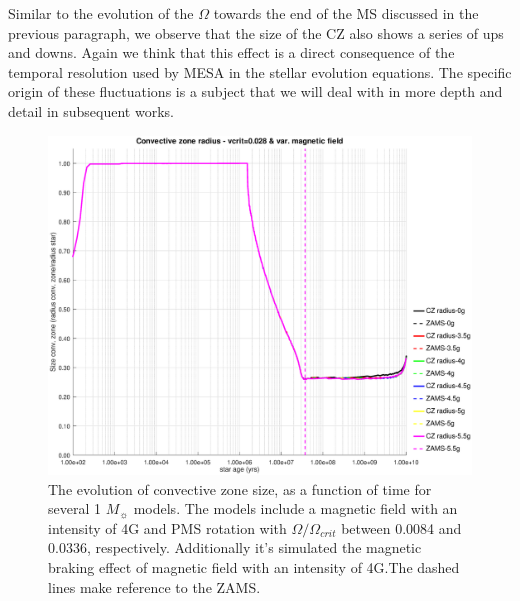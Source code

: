 \documentclass[fleqn,usenatbib]{mnras}
\begin{document}
Similar to the evolution of the $\Omega$ towards the end of the MS discussed in the previous paragraph, we observe that the size of the CZ also shows a series of ups and downs. Again we think that this effect is a direct consequence of the temporal resolution used by MESA in the stellar evolution equations. The specific origin of these fluctuations is a subject that we will deal with in more depth and detail in subsequent works.\par

\begin{figure}
	\includegraphics[trim = 30mm 15mm 20mm 15mm, clip,width=\columnwidth]{figures/cz_vc_028_var_g.eps}
    \caption{The evolution of convective zone size, as a function of time for several 1 $M_{\sun}$ models. The models include a magnetic field with an intensity of 4G and PMS rotation with $\Omega / \Omega_{crit}$ between 0.0084 and 0.0336, respectively. Additionally it's simulated the magnetic braking effect of magnetic field with an intensity of 4G.The dashed lines make reference to the ZAMS.}
    \label{fig:cz_vc_028_var_b}
\end{figure}
\end{document}
